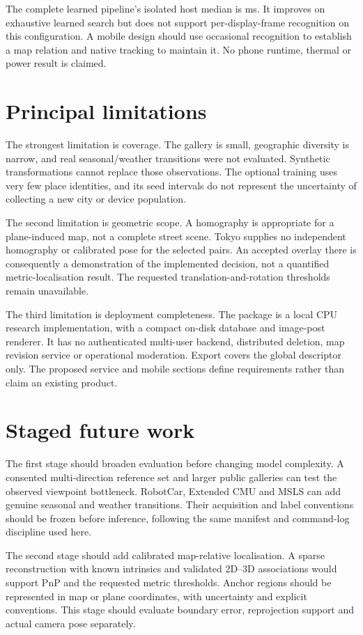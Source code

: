 The complete learned pipeline's isolated host median is \LatencyFull{} ms. It improves on exhaustive learned search but does not support per-display-frame recognition on this configuration. A mobile design should use occasional recognition to establish a map relation and native tracking to maintain it. No phone runtime, thermal or power result is claimed.

\section{Principal limitations}
The strongest limitation is coverage. The gallery is small, geographic diversity is narrow, and real seasonal/weather transitions were not evaluated. Synthetic transformations cannot replace those observations. The optional training uses very few place identities, and its seed intervals do not represent the uncertainty of collecting a new city or device population.

The second limitation is geometric scope. A homography is appropriate for a plane-induced map, not a complete street scene. Tokyo supplies no independent homography or calibrated pose for the selected pairs. An accepted overlay there is consequently a demonstration of the implemented decision, not a quantified metric-localisation result. The requested translation-and-rotation thresholds remain unavailable.

The third limitation is deployment completeness. The package is a local CPU research implementation, with a compact on-disk database and image-post renderer. It has no authenticated multi-user backend, distributed deletion, map revision service or operational moderation. Export covers the global descriptor only. The proposed service and mobile sections define requirements rather than claim an existing product.

\section{Staged future work}
The first stage should broaden evaluation before changing model complexity. A consented multi-direction reference set and larger public galleries can test the observed viewpoint bottleneck. RobotCar, Extended CMU and MSLS can add genuine seasonal and weather transitions. Their acquisition and label conventions should be frozen before inference, following the same manifest and command-log discipline used here.

The second stage should add calibrated map-relative localisation. A sparse reconstruction with known intrinsics and validated 2D--3D associations would support PnP and the requested metric thresholds. Anchor regions should be represented in map or plane coordinates, with uncertainty and explicit conventions. This stage should evaluate boundary error, reprojection support and actual camera pose separately.

